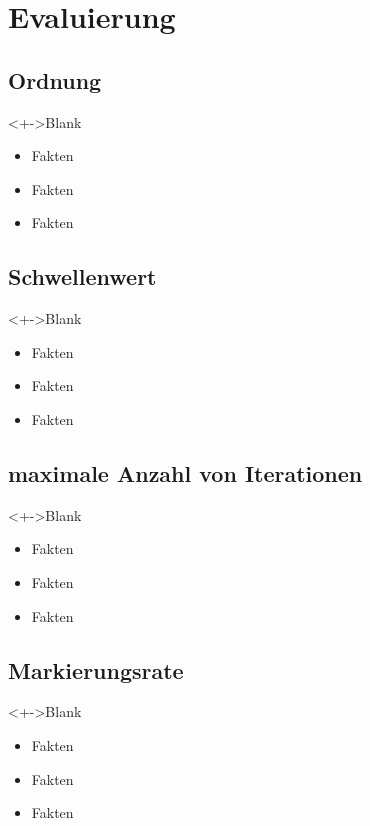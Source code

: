 \section{Evaluierung}

\subsection{Ordnung}

\begin{frame}{\insertsubsection}
  \begin{block}<+->{Blank}
    \begin{itemize}
      \item Fakten
      \item Fakten
      \item Fakten
    \end{itemize}
  \end{block}
\end{frame}

\subsection{Schwellenwert}

\begin{frame}{\insertsubsection}
  \begin{block}<+->{Blank}
    \begin{itemize}
      \item Fakten
      \item Fakten
      \item Fakten
    \end{itemize}
  \end{block}
\end{frame}

\subsection{maximale Anzahl von Iterationen}

\begin{frame}{\insertsubsection}
  \begin{block}<+->{Blank}
    \begin{itemize}
      \item Fakten
      \item Fakten
      \item Fakten
    \end{itemize}
  \end{block}
\end{frame}

\subsection{Markierungsrate}

\begin{frame}{\insertsubsection}
  \begin{block}<+->{Blank}
    \begin{itemize}
      \item Fakten
      \item Fakten
      \item Fakten
    \end{itemize}
  \end{block}
\end{frame}
